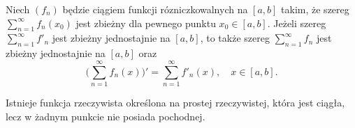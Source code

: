 \documentclass[leqno]{article}
\begin{document}
\begin{justify}
\begin{wniosek}
{
    Niech $(f_n)$ będzie ciągiem funkcji rózniczkowalnych na $[a,b]$ takim, że szereg 
    $\sum\limits_{n=1}^{\infty}f_n(x_0)$ jest zbieżny dla pewnego punktu $x_0 \in [a,b]$. Jeżeli
    szereg $\sum\limits_{n=1}^{\infty}f'_n$ jest zbieżny jednostajnie na $[a,b]$, to także szereg 
    $\sum\limits_{n=1}^{\infty}f_n$ jest zbieżny jednostajnie na $[a,b]$ oraz
    \[
        \Bigg( \sum\limits_{n=1}^{\infty}f_n(x)\Bigg)' = \sum\limits_{n=1}^{\infty}f'_n(x), \quad x \in [a,b]. 
    \]
}
\end{wniosek}

\begin{theorem}
{
    Istnieje funkcja rzeczywista określona na prostej rzeczywistej, która jest ciągła, lecz w żadnym punkcie nie posiada pochodnej.
}
\end{theorem}


\end{justify}
\end{document}
